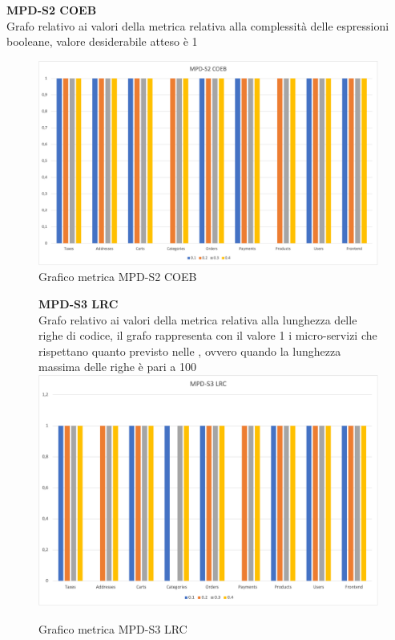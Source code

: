 \begin{center}
    \textbf{MPD-S2 COEB} \\
    Grafo relativo ai valori della metrica relativa alla complessità delle espressioni booleane, valore desiderabile atteso è 1
    \begin{figure}[!htb]
        \centering
        \includegraphics[scale=0.50]{res/images/ra/ra_coeb.png}
        \caption{Grafico metrica MPD-S2 COEB}
    \end{figure}
    \begin{center}
        
    \end{center}

    \begin{figure}[!htb]
        \centering
        \textbf{MPD-S3 LRC} \\
        Grafo relativo ai valori della metrica relativa alla lunghezza delle righe di codice, il grafo rappresenta con il valore 1 i micro-servizi
        che rispettano quanto previsto nelle , ovvero quando la lunghezza massima delle righe è pari a 100 
        \includegraphics[scale=0.50]{res/images/ra/ra_lrc.png}
        \caption{Grafico metrica MPD-S3 LRC}
    \end{figure}
    \begin{center}
        

\end{center}
\end{center}
